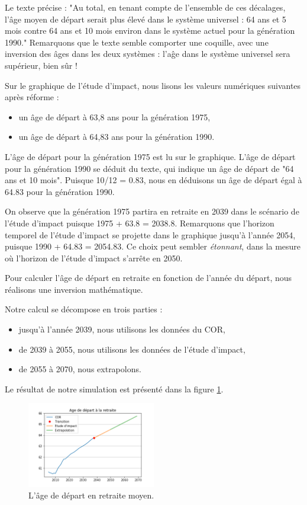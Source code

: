 \documentclass[10pt]{article}
\begin{document}
Le texte précise : "Au total, en tenant compte de l’ensemble de ces 
décalages, l’âge moyen de départ serait plus élevé dans le système 
universel : 64 ans et 5 mois contre 64 ans et 10 mois environ dans 
le système actuel pour la génération 1990." 
Remarquons que le texte semble comporter une coquille, avec une inversion 
des âges dans les deux systèmes : l'aĝe dans le système universel sera supérieur, 
bien sûr ! 

Sur le graphique de l'étude d'impact, nous lisons les valeurs numériques suivantes après réforme :
\begin{itemize}
\item un âge de départ à 63,8 ans pour la génération 1975,
\item un âge de départ à 64,83 ans pour la génération 1990.
\end{itemize}

L'âge de départ pour la génération 1975 est lu sur le graphique. 
L'âge de départ pour la génération 1990 se déduit du texte, qui 
indique un âge de départ de "64 ans et 10 mois". 
Puisque 10/12 = 0.83, nous en déduisons un âge de départ égal à 64.83 pour 
la génération 1990. 

On observe que la génération 1975 partira en retraite en 2039 dans le scénario de l'étude d'impact puisque 1975 + 63.8 = 2038.8.
Remarquons que l'horizon temporel de l'étude d'impact se projette dans le graphique jusqu'à l'année 2054, puisque 1990 + 64.83 = 2054.83. 
Ce choix peut sembler \emph{étonnant}, dans la mesure où l'horizon de l'étude d'impact 
s'arrête en 2050. 

Pour calculer l'âge de départ en retraite en fonction de l'année du départ, 
nous réalisons une inversion mathématique.  

Notre calcul se décompose en trois parties :
\begin{itemize}
\item jusqu'à l'année 2039, nous utilisons les données du COR, 
\item de 2039 à 2055, nous utilisons les données de l'étude d'impact,
\item de 2055 à 2070, nous extrapolons. 
\end{itemize}

Le résultat de notre simulation est présenté dans la figure \ref{fig-simulation-A}. 

\begin{figure}
\centering
\includegraphics[width=0.5\textwidth]{Simulation-Age.png}

\caption{L'âge de départ en retraite moyen.}
\label{fig-simulation-A}
\end{figure}
\end{document}
